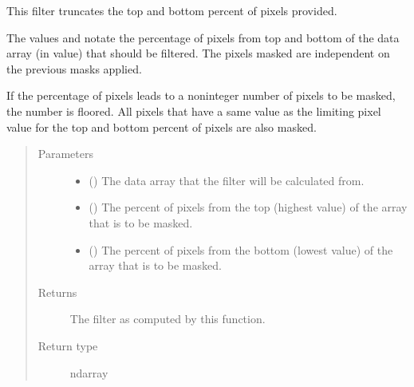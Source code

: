 \documentclass[letterpaper,10pt,english]{sphinxmanual}
\begin{document}
\begin{fulllineitems}
\label{\detokenize{docstrings/ifa_smeargle.masking.filters:ifa_smeargle.masking.filters.filter_percent_truncation}}
This filter truncates the top and bottom percent of pixels
provided.

The values  and  notate the
percentage of pixels from top and bottom of the data array
(in value) that should be filtered. The pixels masked are
independent on the previous masks applied.

If the percentage of pixels leads to a non\sphinxhyphen{}integer number of
pixels to be masked, the number is floored. All pixels that have
a same value as the limiting pixel value for the top and bottom
percent of pixels are also masked.
\begin{quote}\begin{description}
\item[{Parameters}] \leavevmode\begin{itemize}
\item {} 
 () \textendash{} The data array that the filter will be calculated from.

\item {} 
 () \textendash{} The percent of pixels from the top (highest value) of
the array that is to be masked.

\item {} 
 () \textendash{} The percent of pixels from the bottom (lowest value) of
the array that is to be masked.

\end{itemize}

\item[{Returns}] \leavevmode
{} \textendash{} The filter as computed by this function.

\item[{Return type}] \leavevmode
ndarray

\end{description}\end{quote}

\end{fulllineitems}
\end{document}

